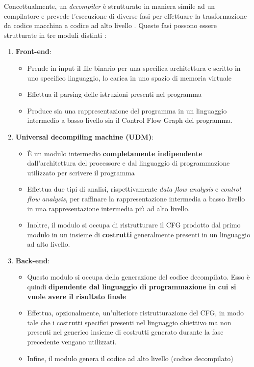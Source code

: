 \documentclass[../main.tex]{subfiles}
\begin{document}
\newpage \noindent
Concettualmente, un \textit{decompiler} è strutturato in maniera simile ad un compilatore e prevede l'esecuzione di diverse fasi per effettuare la trasformazione da codice macchina a codice ad alto livello \cite{Cifuentes1994ReverseCT}. Queste fasi possono essere strutturate in tre moduli distinti \cite{Cifuentes1995DecompilationOB}:
\begin{enumerate}
    \item \textbf{Front-end}:
    \begin{itemize}
        \item Prende in input il file binario per una specifica architettura e scritto in uno specifico linguaggio, lo carica in uno spazio di memoria virtuale
        \item Effettua il parsing delle istruzioni presenti nel programma
        \item Produce sia una rappresentazione del programma in un linguaggio intermedio a basso livello sia il Control Flow Graph del programma.
    \end{itemize}
    \item \textbf{Universal decompiling machine (UDM)}:
    \begin{itemize}
        \item È un modulo intermedio \textbf{completamente indipendente} dall'architettura del processore e dal linguaggio di programmazione utilizzato per scrivere il programma
        \item Effettua due tipi di analisi, rispettivamente \textit{data flow analysis} e \textit{control flow analysis}, per raffinare la rappresentazione intermedia a basso livello in una rappresentazione intermedia più ad alto livello. 
        \item Inoltre, il modulo si occupa di ristrutturare il CFG prodotto dal primo modulo in un insieme di \textbf{costrutti} generalmente presenti in un linguaggio ad alto livello.
    \end{itemize}
    \item \textbf{Back-end}:
    \begin{itemize}
        \item Questo modulo si occupa della generazione del codice decompilato. Esso è quindi \textbf{dipendente dal linguaggio di programmazione in cui si vuole avere il risultato finale}
        \item Effettua, opzionalmente, un'ulteriore ristrutturazione del CFG, in modo tale che i costrutti specifici presenti nel linguaggio obiettivo ma non presenti nel generico insieme di costrutti generato durante la fase precedente vengano utilizzati.
        \item Infine, il modulo genera il codice ad alto livello (codice decompilato)
    \end{itemize}
\end{enumerate}
\end{document}
